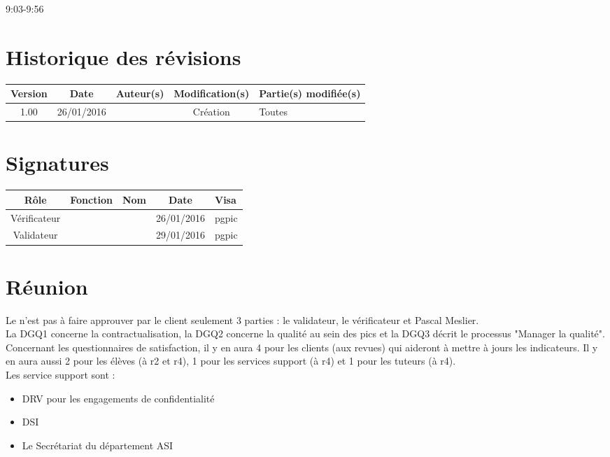 \documentclass [a4paper] {article}
\begin{document}
\rhead{}
\hfill   
\hfill 	9:03-9:56 				%



\section*{Historique des révisions}
\begin{center}
			\begin{tabular}{| c | c | c | c | p{4cm} |}
				\hline
				\rowcolor{Gray}
				Version & Date & Auteur(s) & Modification(s) & Partie(s) modifiée(s)		 \\
				\hline
				1.00 & 26/01/2016 & \Pierre & Création & Toutes \\
		\hline		
			\end{tabular}
		\end{center}

\section*{Signatures}

		\begin{center}
			\begin{tabular}{| c | c | c | c | p{4cm} |}
				\hline
				\rowcolor{Gray}
				Rôle & Fonction & Nom & Date & Visa		 \\
				\hline
				Vérificateur & \RQA & \Kafui & 26/01/2016 & pgpic \\[30pt]
				\hline
				Validateur & \CP & \Sergi & 29/01/2016 & pgpic \\[30pt]	
				\hline
			\end{tabular}
		\end{center}


\section{Réunion}
Le \PQ{} n'est pas à faire approuver par le client seulement 3 parties : le validateur, le vérificateur et Pascal Meslier.
\\
La DGQ1 concerne la contractualisation, la DGQ2 concerne la qualité au sein des pics et la DGQ3 décrit le processus "Manager la qualité".
\\
Concernant les questionnaires de satisfaction, il y en aura 4 pour les clients (aux revues) qui aideront à mettre à jours les indicateurs. Il y en aura aussi 2 pour les élèves (à r2 et r4), 1 pour les services support (à r4) et 1 pour les tuteurs (à r4).
\\
Les service support sont : 
\begin{itemize}
\item DRV pour les engagements de confidentialité
\item DSI
\item Le Secrétariat du département ASI
\end{itemize}
\end{document}
